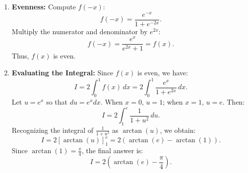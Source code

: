 \begin{enumerate}
        \item \textbf{Evenness:}  
        Compute \( f(-x) \):
        \[
        f(-x) = \frac{e^{-x}}{1 + e^{-2x}}.
        \]
        Multiply the numerator and denominator by \( e^{2x} \):
        \[
        f(-x) = \frac{e^{x}}{e^{2x} + 1} = f(x).
        \]
        Thus, \( f(x) \) is even.
    
        \item \textbf{Evaluating the Integral:}  
        Since \( f(x) \) is even, we have:
        \[
        I = 2 \int_{0}^{1} f(x) \, dx = 2 \int_{0}^{1} \frac{e^x}{1 + e^{2x}} \, dx.
        \]
        Let \( u = e^x \) so that \( du = e^x dx \). When \( x=0 \), \( u=1 \); when \( x=1 \), \( u=e \). Then:
        \[
        I = 2 \int_{1}^{e} \frac{1}{1+u^2}\, du.
        \]
        Recognizing the integral of \( \frac{1}{1+u^2} \) as \( \arctan(u) \), we obtain:
        \[
        I = 2 \left[ \arctan(u) \right]_{1}^{e} = 2 \left( \arctan(e) - \arctan(1) \right).
        \]
        Since \( \arctan(1) = \frac{\pi}{4} \), the final answer is:
        \[
        I = 2 \left( \arctan(e) - \frac{\pi}{4} \right).
        \]
    \end{enumerate}